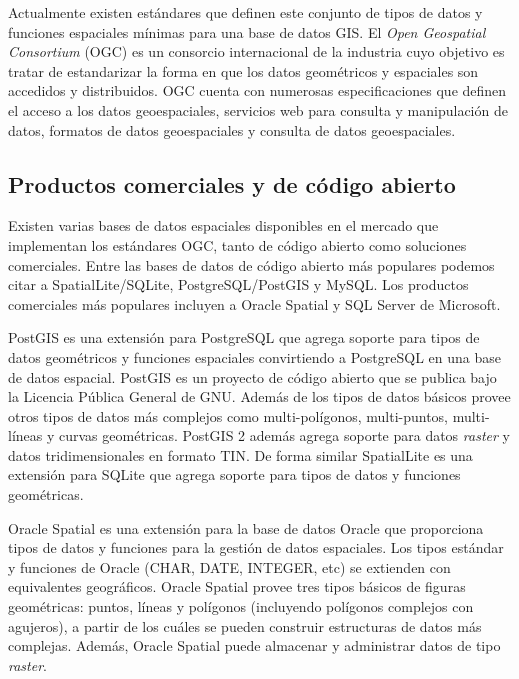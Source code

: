 
Actualmente existen estándares que definen este conjunto de tipos de datos y funciones espaciales mínimas para una base de datos GIS. El \emph{Open Geospatial Consortium} (OGC) es un consorcio internacional de la industria cuyo objetivo es tratar de estandarizar la forma en que los datos geométricos y espaciales son accedidos y distribuidos. OGC cuenta con numerosas especificaciones que definen el acceso a los datos geoespaciales, servicios web para consulta y manipulación de datos, formatos de datos geoespaciales y consulta de datos geoespaciales.

\subsection{Productos comerciales y de código abierto}


Existen varias bases de datos espaciales disponibles en el mercado que implementan los estándares OGC, tanto de código abierto como soluciones comerciales. Entre las bases de datos de código abierto más populares podemos citar a SpatialLite/SQLite, PostgreSQL/PostGIS y MySQL. Los productos comerciales más populares incluyen a Oracle Spatial y SQL Server de Microsoft.

PostGIS es una extensión para PostgreSQL que agrega soporte para tipos de datos geométricos y funciones espaciales convirtiendo a PostgreSQL en una base de datos espacial. PostGIS es un proyecto de código abierto que se publica bajo la Licencia Pública General de GNU. Además de los tipos de datos básicos provee otros tipos de datos más complejos como multi-polígonos, multi-puntos, multi-líneas y curvas geométricas. PostGIS 2 además agrega soporte para datos \emph{raster} y datos tridimensionales en formato TIN. De forma similar SpatialLite es una extensión para SQLite que agrega soporte para tipos de datos y funciones geométricas.

Oracle Spatial es una extensión para la base de datos Oracle que proporciona tipos de datos y funciones para la gestión de datos espaciales. Los tipos estándar y funciones de Oracle (CHAR, DATE, INTEGER, etc) se extienden con equivalentes geográficos. Oracle Spatial provee tres tipos básicos de figuras geométricas: puntos, líneas y polígonos (incluyendo polígonos complejos con agujeros), a partir de los cuáles se pueden construir estructuras de datos más complejas. Además, Oracle Spatial puede almacenar y administrar datos de tipo \emph{raster}.
